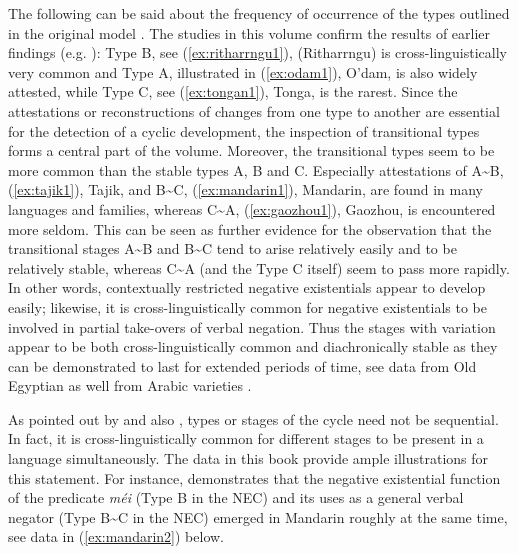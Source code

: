 \documentclass[output=paper,chinesefont,colorlinks,citecolor=brown]{langscibook}
\begin{document}
The following can be said about the frequency of occurrence of the types outlined in the original model \citep{Croft1991}. The studies in this volume confirm the results of earlier findings (e.g. \citealt{Croft1991,Veselinova2014,Veselinova2016}): Type B, see (\ref{ex:ritharrngu1}), (Ritharrngu) is cross-linguistically very common and Type A, illustrated in (\ref{ex:odam1}), O'dam, is also widely attested, while Type C, see (\ref{ex:tongan1}), Tonga, is the rarest. Since the attestations or reconstructions of changes from one type to another are essential for the detection of a cyclic development, the inspection of transitional types forms a central part of the volume. Moreover, the transitional types seem to be more common than the stable types A, B and C. Especially attestations of A{\textasciitilde}B, (\ref{ex:tajik1}), Tajik, and B{\textasciitilde}C, (\ref{ex:mandarin1}), Mandarin, are found in many languages and families, whereas C{\textasciitilde}A, (\ref{ex:gaozhou1}), Gaozhou, is encountered more seldom. This can be seen as further evidence for the observation that the transitional stages A{\textasciitilde}B and B{\textasciitilde}C tend to arise relatively easily and to be relatively stable, whereas C{\textasciitilde}A (and the Type C itself) seem to pass more rapidly. In other words, contextually restricted negative existentials appear to develop easily; likewise, it is cross-linguistically common for negative existentials to be involved in partial take-overs of verbal negation. Thus the stages with variation appear to be both cross-linguistically common and diachronically stable as they can be demonstrated to last for extended periods of time, see data from Old Egyptian  as well from Arabic varieties .

As pointed out by \citet{Croft1991} and also \citet{Veselinova2016}, types or stages of the cycle need not be sequential. In fact, it is cross-linguistically common for different stages to be present in a language simultaneously. The data in this book provide ample illustrations for this statement. For instance,  demonstrates that the negative existential function of the predicate \textit{méi} (Type B in the NEC) and its uses as a general verbal negator (Type B{\textasciitilde}C in the NEC) emerged in Mandarin roughly at the same time, see data in (\ref{ex:mandarin2}) below.
\end{document}
